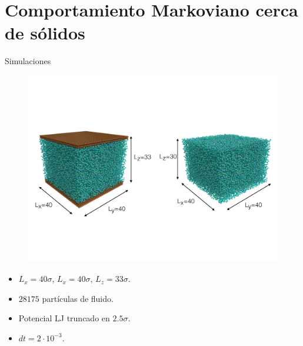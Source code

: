 \documentclass{beamer}
\begin{document}
\section{Comportamiento Markoviano cerca de sólidos}

\begin{frame}{Simulaciones}
\begin{figure}
    \centering
    \includegraphics[width=0.8\linewidth]{dim-sim-pbc-walls}
\end{figure}
    \begin{itemize}
      \item $L_x=40\sigma$, $L_x=40\sigma$, $L_z=33\sigma$.
     \item $28175$ partículas de fluido. 
     \item Potencial LJ truncado en $2.5\sigma$.
     \item $dt=2\cdot 10^{-3}$.
    \end{itemize}
\end{frame}
\end{document}
